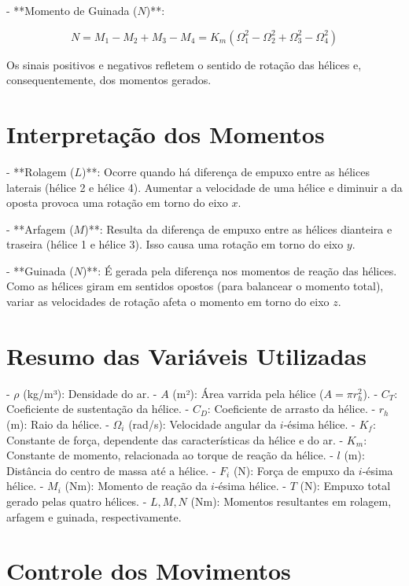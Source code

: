 - **Momento de Guinada (\( N \))**:

\begin{equation}
N = M_1 - M_2 + M_3 - M_4 = K_m (\Omega_1^2 - \Omega_2^2 + \Omega_3^2 - \Omega_4^2)
\label{eq:momento_guinada}
\end{equation}

Os sinais positivos e negativos refletem o sentido de rotação das hélices e, consequentemente, dos momentos gerados.

\section{Interpretação dos Momentos}

- **Rolagem (\( L \))**: Ocorre quando há diferença de empuxo entre as hélices laterais (hélice 2 e hélice 4). Aumentar a velocidade de uma hélice e diminuir a da oposta provoca uma rotação em torno do eixo \( x \).

- **Arfagem (\( M \))**: Resulta da diferença de empuxo entre as hélices dianteira e traseira (hélice 1 e hélice 3). Isso causa uma rotação em torno do eixo \( y \).

- **Guinada (\( N \))**: É gerada pela diferença nos momentos de reação das hélices. Como as hélices giram em sentidos opostos (para balancear o momento total), variar as velocidades de rotação afeta o momento em torno do eixo \( z \).

\section{Resumo das Variáveis Utilizadas}

- \( \rho \) (kg/m³): Densidade do ar.
- \( A \) (m²): Área varrida pela hélice (\( A = \pi r_h^2 \)).
- \( C_T \): Coeficiente de sustentação da hélice.
- \( C_D \): Coeficiente de arrasto da hélice.
- \( r_h \) (m): Raio da hélice.
- \( \Omega_i \) (rad/s): Velocidade angular da \( i \)-ésima hélice.
- \( K_f \): Constante de força, dependente das características da hélice e do ar.
- \( K_m \): Constante de momento, relacionada ao torque de reação da hélice.
- \( l \) (m): Distância do centro de massa até a hélice.
- \( F_i \) (N): Força de empuxo da \( i \)-ésima hélice.
- \( M_i \) (Nm): Momento de reação da \( i \)-ésima hélice.
- \( T \) (N): Empuxo total gerado pelas quatro hélices.
- \( L, M, N \) (Nm): Momentos resultantes em rolagem, arfagem e guinada, respectivamente.

\section{Controle dos Movimentos}

